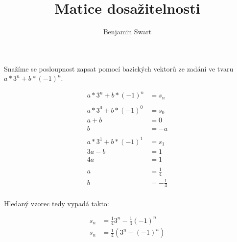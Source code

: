 \documentclass{article}
\title{Matice dosažitelnosti}
\author{Benjamin Swart}
\begin{document}
Snažíme se posloupnost zapsat pomocí bazických vektorů ze zadání ve tvaru $a * 3^n + b * (-1)^n$.

\begin{align*}
    a * 3^n + b * (-1)^n & = s_n          \\
    \\
    a * 3^0 + b * (-1)^0 & = s_0          \\
    a + b                & = 0            \\
    b                    & = -a           \\
    \\
    a * 3^1 + b * (-1)^1 & = s_1          \\
    3a - b               & = 1            \\
    4a                   & = 1            \\
    \\
    a                    & = \frac{1}{4}  \\
    b                    & = -\frac{1}{4} \\
\end{align*}

Hledaný vzorec tedy vypadá takto:

\begin{align*}
    s_n & = \frac{1}{4} 3^n - \frac{1}{4} (-1)^n  \\
    s_n & = \frac{1}{4} \left(3^n - \left(-1\right)^n\right) \\
\end{align*}
\end{document}
